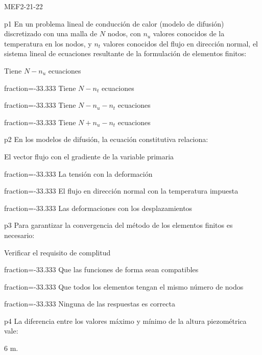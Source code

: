 \documentclass[a4paper]{article}
\begin{document}
	
\begin{quiz}{MEF2-21-22}

\begin{multi}{p1}
En un problema lineal de conducci\'on de calor (modelo de difusi\'on) discretizado con
una malla de $N$ nodos, con $n_u$ valores conocidos de la temperatura en los
nodos, y $n_t$ valores conocidos del flujo en direcci\'on normal, el sistema
lineal de ecuaciones resultante de la formulaci\'on de elementos finitos:
	\item* Tiene $N-n_u$ ecuaciones
	\item[fraction=-33.333] Tiene $N-n_t$ ecuaciones
	\item[fraction=-33.333] Tiene $N-n_u-n_t$ ecuaciones
	\item[fraction=-33.333]Tiene $N+n_u-n_t$ ecuaciones
\end{multi}
\begin{multi}{p2}
En los modelos de difusi\'on, la ecuaci\'on constitutiva relaciona:
	\item* El vector flujo con el gradiente de la variable primaria
	\item[fraction=-33.333] La tensi\'on con la deformaci\'on
	\item[fraction=-33.333] El flujo en direcci\'on normal con la temperatura impuesta
	\item[fraction=-33.333] Las deformaciones con los desplazamientos
\end{multi}
\begin{multi}{p3}
Para garantizar la convergencia del m\'etodo de los elementos finitos es
necesario:
	\item* Verificar el requisito de complitud
	\item[fraction=-33.333] Que las funciones de forma sean compatibles
    \item[fraction=-33.333] Que todos los elementos tengan el mismo n\'umero de nodos
	\item[fraction=-33.333] Ninguna de las respuestas es correcta
\end{multi}
\begin{multi}{p4}
	La diferencia entre los valores m\'aximo y m\'inimo de la altura piezom\'etrica
	vale:
	\item* $6$ m.

\end{multi}
\end{quiz}
\end{document}
